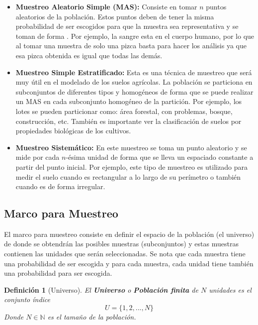 \documentclass[conference]{IEEEtran}
\newtheorem{definition}{Definición}
\begin{document}
\begin{itemize}
    \item \textbf{Muestreo Aleatorio Simple (MAS):} Consiste en tomar $n$ puntos aleatorios de la población. Estos puntos deben de tener la misma probabilidad de ser escogidos para que la muestra sea representativa y se toman de forma . Por ejemplo, la sangre esta  en el cuerpo humano, por lo que al tomar una muestra de solo una pizca basta para hacer los análisis ya que esa pizca obtenida es igual que todas las demás.
    
    \item \textbf{Muestreo Simple Estratificado:} Esta es una técnica de muestreo que será muy útil en el modelado de los suelos agrícolas. La población se particiona en subconjuntos de diferentes tipos y homogéneos de forma que se puede realizar un MAS en cada subconjunto homogéneo de la partición. Por ejemplo, los lotes se pueden particionar como: área forestal, con problemas, bosque, construcción, etc. También es importante ver la clasificación de suelos por propiedades biológicas de los cultivos.
    
    \item \textbf{Muestreo Sistemático:} En este muestreo se toma un punto aleatorio y se mide por cada $n$-ésima unidad de forma que se lleva un espaciado constante a partir del punto inicial. Por ejemplo, este tipo de muestreo es utilizado para medir el suelo cuando es rectangular a lo largo de su perímetro o también cuando es de forma irregular.
\end{itemize}

\subsection{Marco para Muestreo}

El marco para muestreo \cite{lohr-2009} consiste en definir el espacio de la población (el universo) de donde se obtendrán las posibles muestras (subconjuntos) y estas muestras contienen las unidades que serán seleccionadas. Se nota que cada muestra tiene una probabilidad de ser escogida y para cada muestra, cada unidad tiene también una probabilidad para ser escogida.

\begin{definition}[Universo]
    El \textbf{Universo} o \textbf{Población finita} de $N$ unidades es el conjunto índice
    $$
    U = \{ 1, 2, ..., N \}
    $$
    Donde $N \in \mathbb{N}$ es el tamaño de la población.
\end{definition}
\end{document}
